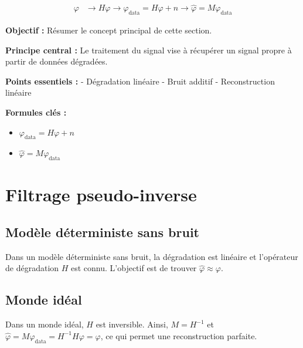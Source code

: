 \documentclass[12pt]{article}
\begin{document}
\begin{align}
\varphi & \rightarrow H\varphi \rightarrow \varphi_{\text{data}} = H\varphi + n \rightarrow \hat{\varphi} = M\varphi_{\text{data}}
\end{align}

\begin{tcolorbox}[colback=red!5!white, colframe=red!75!black, title={\faBookmark\hspace{0.5em}Fiche Récapitulative}]
\textbf{Objectif :} Résumer le concept principal de cette section.

\textbf{Principe central :} Le traitement du signal vise à récupérer un signal propre à partir de données dégradées.

\vspace{0.4em}
\textbf{Points essentiels :}  
- Dégradation linéaire
- Bruit additif
- Reconstruction linéaire

\vspace{0.4em}
\textbf{Formules clés :}  
\begin{itemize}
\item $\varphi_{\text{data}} = H\varphi + n$
\item $\hat{\varphi} = M\varphi_{\text{data}}$
\end{itemize}
\end{tcolorbox}

\newpage

\section{Filtrage pseudo-inverse}

\subsection{Modèle déterministe sans bruit}

Dans un modèle déterministe sans bruit, la dégradation est linéaire et l'opérateur de dégradation $H$ est connu. L'objectif est de trouver $\hat{\varphi} \approx \varphi$.


\subsection{Monde idéal}

Dans un monde idéal, $H$ est inversible. Ainsi, $M = H^{-1}$ et $\hat{\varphi} = M\varphi_{\text{data}} = H^{-1}H\varphi = \varphi$, ce qui permet une reconstruction parfaite.
\end{document}
